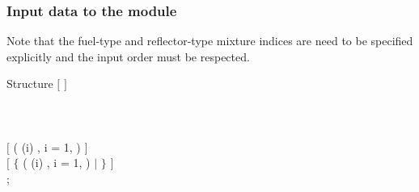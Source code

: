 \vskip 0.2cm

\subsubsection{Input data to the  module}\label{sect:usplitstr}
\noindent
Note that the fuel-type and reflector-type mixture indices are need to be
specified explicitly and the input order must be respected.
\begin{DataStructure}{Structure }
$[$   $]$ \\
   \\
   \\
   \\
$[$    ( (i) ,  i = 1,  )  $]$ \\
$[$  $\{$   ( (i) ,  i = 1,  )  $|$  $\}$  $]$ \\
;
\end{DataStructure}

